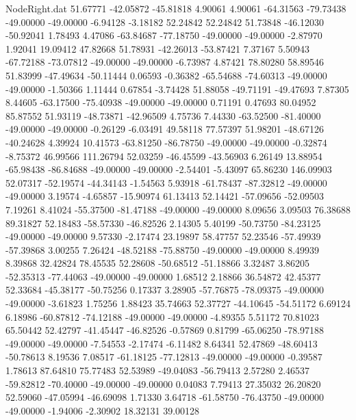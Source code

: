 \begin{filecontents}{NodeRight.dat}
  51.67771  -42.05872  -45.81818     4.90061    4.90061  -64.31563  -79.73438  -49.00000  -49.00000   -6.94128   -3.18182   52.24842   52.24842
  51.73848  -46.12030  -50.92041     1.78493    4.47086  -63.84687  -77.18750  -49.00000  -49.00000   -2.87970    1.92041   19.09412   47.82668
  51.78931  -42.26013  -53.87421     7.37167    5.50943  -67.72188  -73.07812  -49.00000  -49.00000   -6.73987    4.87421   78.80280   58.89546
  51.83999  -47.49634  -50.11444     0.06593   -0.36382  -65.54688  -74.60313  -49.00000  -49.00000   -1.50366    1.11444    0.67854   -3.74428
  51.88058  -49.71191  -49.47693     7.87305    8.44605  -63.17500  -75.40938  -49.00000  -49.00000    0.71191    0.47693   80.04952   85.87552
  51.93119  -48.73871  -42.96509     4.75736    7.44330  -63.52500  -81.40000  -49.00000  -49.00000   -0.26129   -6.03491   49.58118   77.57397
  51.98201  -48.67126  -40.24628     4.39924   10.41573  -63.81250  -86.78750  -49.00000  -49.00000   -0.32874   -8.75372   46.99566  111.26794
  52.03259  -46.45599  -43.56903     6.26149   13.88954  -65.98438  -86.84688  -49.00000  -49.00000   -2.54401   -5.43097   65.86230  146.09903
  52.07317  -52.19574  -44.34143    -1.54563    5.93918  -61.78437  -87.32812  -49.00000  -49.00000    3.19574   -4.65857  -15.90974   61.13413
  52.14421  -57.09656  -52.09503     7.19261    8.41024  -55.37500  -81.47188  -49.00000  -49.00000    8.09656    3.09503   76.38688   89.31827
  52.18483  -58.57330  -46.82526     2.14305    5.40199  -50.73750  -84.23125  -49.00000  -49.00000    9.57330   -2.17474   23.19897   58.47757
  52.23546  -57.49939  -57.39868     3.00255    7.26424  -48.52188  -75.88750  -49.00000  -49.00000    8.49939    8.39868   32.42824   78.45535
  52.28608  -50.68512  -51.18866     3.32487    3.86205  -52.35313  -77.44063  -49.00000  -49.00000    1.68512    2.18866   36.54872   42.45377
  52.33684  -45.38177  -50.75256     0.17337    3.28905  -57.76875  -78.09375  -49.00000  -49.00000   -3.61823    1.75256    1.88423   35.74663
  52.37727  -44.10645  -54.51172     6.69124    6.18986  -60.87812  -74.12188  -49.00000  -49.00000   -4.89355    5.51172   70.81023   65.50442
  52.42797  -41.45447  -46.82526    -0.57869    0.81799  -65.06250  -78.97188  -49.00000  -49.00000   -7.54553   -2.17474   -6.11482    8.64341
  52.47869  -48.60413  -50.78613     8.19536    7.08517  -61.18125  -77.12813  -49.00000  -49.00000   -0.39587    1.78613   87.64810   75.77483
  52.53989  -49.04083  -56.79413     2.57280    2.46537  -59.82812  -70.40000  -49.00000  -49.00000    0.04083    7.79413   27.35032   26.20820
  52.59060  -47.05994  -46.69098     1.71330    3.64718  -61.58750  -76.43750  -49.00000  -49.00000   -1.94006   -2.30902   18.32131   39.00128

\end{filecontents}
